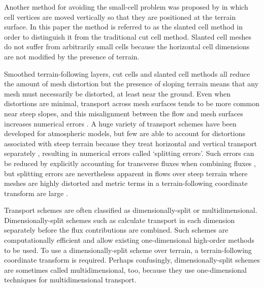 Another method for avoiding the small-cell problem was proposed by \citep{shaw-weller2016} in which cell vertices are moved vertically so that they are positioned at the terrain surface.  In this paper the method is referred to as the slanted cell method in order to distinguish it from the traditional cut cell method.  Slanted cell meshes do not suffer from arbitrarily small cells because the horizontal cell dimensions are not modified by the presence of terrain.  

Smoothed terrain-following layers, cut cells and slanted cell methods all reduce the amount of mesh distortion but the presence of sloping terrain means that any mesh must necessarily be distorted, at least near the ground.
Even when distortions are minimal, transport across mesh surfaces tends to be more common near steep slopes, and this misalignment between the flow and mesh surfaces increases numerical errors \citep{leonard1993,schaer2002,shaw-weller2016}.
A huge variety of transport schemes have been developed for atmospheric models, but few are able to account for distortions associated with steep terrain because they treat horizontal and vertical transport separately , resulting in numerical errors called `splitting errors'.
Such errors can be reduced by explicitly accounting for transverse fluxes when combining fluxes \citep{leonard1996}, but splitting errors are nevertheless apparent in flows over steep terrain where meshes are highly distorted and metric terms in a terrain-following coordinate transform are large \citep{weller2017}.

Transport schemes are often classified as dimensionally-split or multidimensional.
Dimensionally-split schemes such as \citep{lin-rood1996,katta2015} calculate transport in each dimension separately before the flux contributions are combined.  Such schemes are computationally efficient and allow existing one-dimensional high-order methods to be used.  To use a dimensionally-split scheme over terrain, a terrain-following coordinate transform is required.
Perhaps confusingly, dimensionally-split schemes are sometimes called multidimensional, too, because they use one-dimensional techniques for multidimensional transport.

